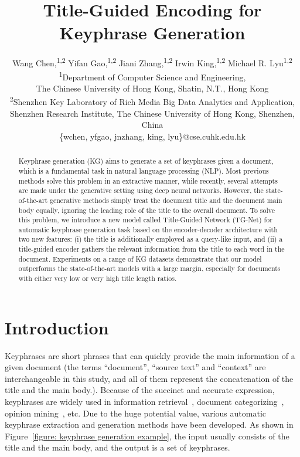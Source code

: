 \documentclass[letterpaper]{article} %
\title{Title-Guided Encoding for Keyphrase Generation}
\author{Wang Chen,\textsuperscript{1,2} Yifan Gao,\textsuperscript{1,2} Jiani Zhang,\textsuperscript{1,2} Irwin King,\textsuperscript{1,2} Michael R. Lyu\textsuperscript{1,2} \\
  \textsuperscript{1}Department of Computer Science and Engineering, \\
The Chinese University of Hong Kong, Shatin, N.T., Hong Kong \\
\textsuperscript{2}Shenzhen Key Laboratory of Rich Media Big Data Analytics and Application, \\
Shenzhen Research Institute, The Chinese University of Hong Kong, Shenzhen, China \\
  \{wchen, yfgao, jnzhang, king, lyu\}@cse.cuhk.edu.hk \\
  }
\begin{document}
%
\maketitle

\begin{abstract}
Keyphrase generation (KG) aims to generate a set of keyphrases given a document, which is a fundamental task in natural language processing (NLP). Most previous methods solve this problem in an extractive manner, while recently, several attempts are made under the generative setting using deep neural networks. However, the state-of-the-art generative methods simply treat the document title and the document main body equally, ignoring the leading role of the title to the overall document. To solve this problem, we introduce a new model called Title-Guided Network (TG-Net) for automatic keyphrase generation task based on the encoder-decoder architecture with two new features: (\textrm{i}) the title is additionally employed as a query-like input, and (\textrm{ii}) a title-guided encoder gathers the relevant information from the title to each word in the document. Experiments on a range of KG datasets demonstrate that our model outperforms the state-of-the-art models with a large margin, especially for documents with either very low or very high title length ratios.
\end{abstract}


\section{Introduction}
Keyphrases are short phrases that can quickly provide the main information of a given document (the terms ``document'', ``source text'' and ``context'' are interchangeable in this study, and all of them represent the concatenation of the title and the main body.). Because of the succinct and accurate expression, keyphrases are widely used in information retrieval~\cite{jones1999phrasier}, document categorizing~\cite{hulth2006study}, opinion mining~\cite{berend2011opinion}, etc. Due to the huge potential value, various automatic keyphrase extraction and generation methods have been developed. As shown in Figure~\ref{figure: keyphrase generation example}, the input usually consists of the title and the main body, and the output is a set of keyphrases. 
\end{document}
